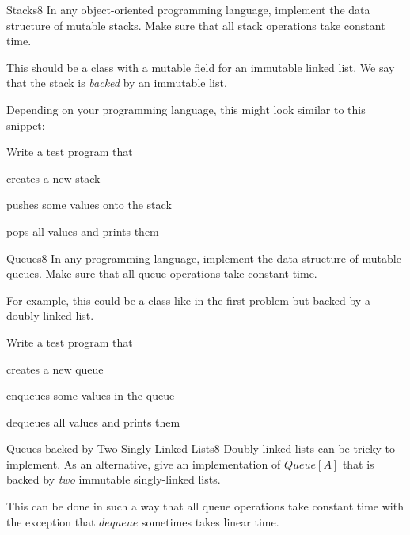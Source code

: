 \documentclass[a4paper]{article}
\begin{document}
\header

\begin{problem}{Stacks}{8}
In any object-oriented programming language, implement the data structure of mutable stacks.
Make sure that all stack operations take constant time.

This should be a class with a mutable field for an immutable linked list.
We say that the stack is \emph{backed} by an immutable list.

Depending on your programming language, this might look similar to this snippet:
\begin{acode}
\end{acode}

Write a test program that
\begin{compactitem}
 \item creates a new stack
 \item pushes some values onto the stack
 \item pops all values and prints them
\end{compactitem}
\end{problem}

\begin{problem}{Queues}{8}
In any programming language, implement the data structure of mutable queues.
Make sure that all queue operations take constant time.

For example, this could be a class like in the first problem but backed by a doubly-linked list.

Write a test program that
\begin{compactitem}
 \item creates a new queue
 \item enqueues some values in the queue
 \item dequeues all values and prints them
\end{compactitem}
\end{problem}


\begin{problem}{Queues backed by Two Singly-Linked Lists}{8}
Doubly-linked lists can be tricky to implement.
As an alternative, give an implementation of $Queue[A]$ that is backed by \emph{two} immutable singly-linked lists.

This can be done in such a way that all queue operations take constant time with the exception that $dequeue$ sometimes takes linear time.

\end{problem}
\end{document}

